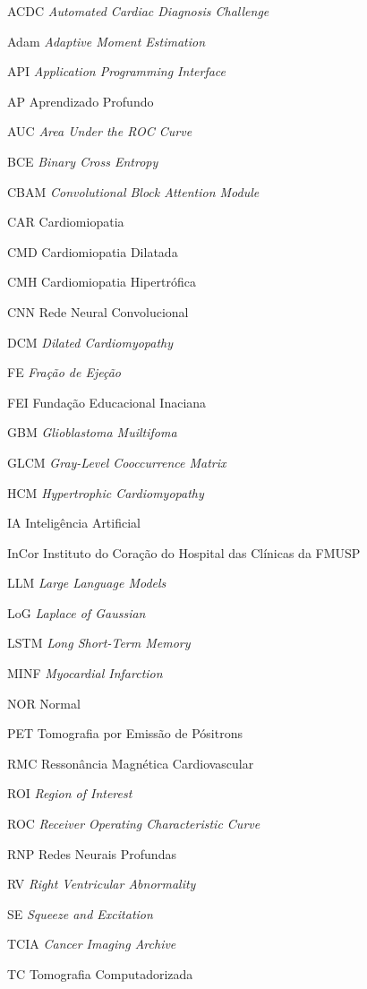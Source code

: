 \begin{siglas}
    \item[ACDC] \textit{Automated Cardiac Diagnosis Challenge}
    \item[Adam] \textit{Adaptive Moment Estimation}
    \item[API] \textit{Application Programming Interface}
    \item[AP] Aprendizado Profundo
    \item[AUC] \textit{Area Under the ROC Curve}
    \item[BCE] \textit{Binary Cross Entropy}
    \item[CBAM] \textit{Convolutional Block Attention Module}
    \item[CAR] Cardiomiopatia
    \item[CMD] Cardiomiopatia Dilatada
    \item[CMH] Cardiomiopatia Hipertrófica
    \item[CNN] Rede Neural Convolucional
    \item[DCM] \textit{Dilated Cardiomyopathy}
    \item[FE] \textit{Fração de Ejeção}
    \item[FEI] Fundação Educacional Inaciana
    \item[GBM] \textit{Glioblastoma Muiltifoma}
    \item[GLCM] \textit{Gray-Level Cooccurrence Matrix}
    \item[HCM] \textit{Hypertrophic Cardiomyopathy}
    \item[IA] Inteligência Artificial
    \item[InCor] Instituto do Coração do Hospital das Clínicas da FMUSP
    \item[LLM] \textit{Large Language Models}
    \item[LoG] \textit{Laplace of Gaussian}
    \item[LSTM] \textit{Long Short-Term Memory}
    \item[MINF] \textit{Myocardial Infarction}
    \item[NOR] Normal
    \item[PET] Tomografia por Emissão de Pósitrons
    \item[RMC] Ressonância Magnética Cardiovascular
    \item[ROI] \textit{Region of Interest}
    \item[ROC] \textit{Receiver Operating Characteristic Curve}
    \item[RNP] Redes Neurais Profundas
    \item[RV] \textit{Right Ventricular Abnormality}
    \item[SE] \textit{Squeeze and Excitation}
    \item[TCIA] \textit{Cancer Imaging Archive}
    \item[TC] Tomografia Computadorizada
\end{siglas}


